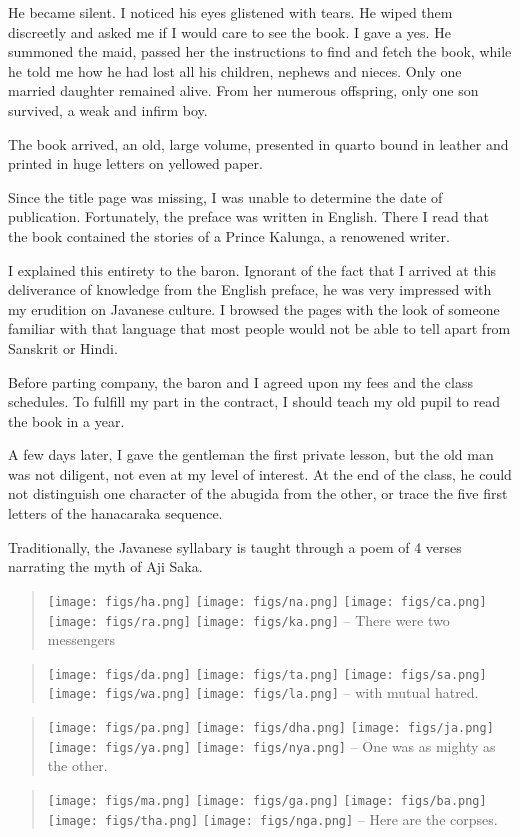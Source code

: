 \documentclass[a4paper,12pt]{book}
\begin{document}
He became silent. I noticed his eyes glistened
with tears.
He wiped them discreetly and asked me if I
would care to see the book. I gave a yes.
He summoned the maid, passed her the instructions
to find and fetch the book,
while he told me how he had lost all his children,
nephews and nieces. Only one married daughter
remained alive. From her numerous offspring,
only one son survived, a  weak and infirm boy.

The book arrived, an old,
large volume, presented in
quarto bound in leather and printed in huge
letters on yellowed paper.

Since the title page
was missing, I was unable to determine
the date of publication. Fortunately,
the preface was written
in English. There I read that the book
contained the stories of a Prince Kalunga,
a renowened writer.

I explained this entirety to the baron.
Ignorant of the fact that I arrived at 
this deliverance of knowledge
from the English preface, he was
very impressed with my erudition on
Javanese culture. I browsed the pages
with the look of someone familiar
with that language that most people
would not be able to tell apart from
Sanskrit or Hindi.

Before parting company, the baron and I
agreed upon my fees
and the class schedules.
To fulfill my part in the contract,
I should teach my old pupil to read
the book in a year.

A few days later, I gave the gentleman
the first private lesson, but the old man
was not diligent, not even at my level
of interest. At the
end of the class, he could not distinguish
one character of the abugida from the other,
or trace the five first letters of the
hanacaraka sequence.

Traditionally, the Javanese syllabary
is taught through a poem of 4 verses
narrating the myth of Aji Saka.
\begin{quote}
\texttt{[image: figs/ha.png]}
\texttt{[image: figs/na.png]}
\texttt{[image: figs/ca.png]}
\texttt{[image: figs/ra.png]}
\texttt{[image: figs/ka.png]} --
There were two messengers
\end{quote}
\begin{quote}
\texttt{[image: figs/da.png]}
\texttt{[image: figs/ta.png]}
\texttt{[image: figs/sa.png]}
\texttt{[image: figs/wa.png]}
\texttt{[image: figs/la.png]} --
with mutual hatred.
\end{quote}
\begin{quote}
\texttt{[image: figs/pa.png]}
\texttt{[image: figs/dha.png]}
\texttt{[image: figs/ja.png]}
\texttt{[image: figs/ya.png]}
\texttt{[image: figs/nya.png]} --
One was as mighty as the other.
\end{quote}
\begin{quote}
\texttt{[image: figs/ma.png]}
\texttt{[image: figs/ga.png]}
\texttt{[image: figs/ba.png]}
\texttt{[image: figs/tha.png]}
\texttt{[image: figs/nga.png]} --
Here are the corpses.
\end{quote}
\end{document}
